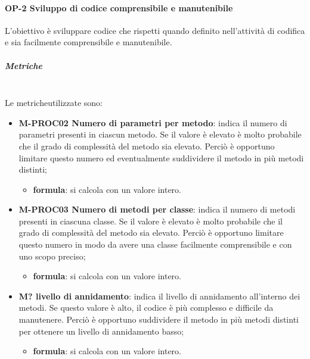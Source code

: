 		\paragraph{OP-2 Sviluppo di codice comprensibile e manutenibile}
		L'obiettivo è sviluppare codice che rispetti quando definito nell'attività di codifica e sia facilmente comprensibile e manutenibile.
		\subparagraph{Metriche}\mbox{}\\ [1mm]
		Le metriche\glosp utilizzate sono:
			\begin{itemize}
				\item \textbf{M-PROC02 Numero di parametri per metodo}: indica il numero di parametri presenti in ciascun metodo. Se il valore è elevato è molto probabile che il grado di complessità del metodo sia elevato. Perciò è opportuno limitare questo numero ed eventualmente suddividere il metodo in più metodi distinti;
				\begin{itemize}
					\item[] \textbf{formula}: si calcola con un valore intero.
				\end{itemize}
				\item \textbf{M-PROC03 Numero di metodi per classe}: indica il numero di metodi presenti in ciascuna classe. Se il valore è elevato è molto probabile che il grado di complessità del metodo sia elevato. Perciò è opportuno limitare questo numero in modo da avere una classe facilmente comprensibile e con uno scopo preciso;
				\begin{itemize}
					\item[] \textbf{formula}: si calcola con un valore intero.
				\end{itemize}
				\item \textbf{M? livello di annidamento}: indica il livello di annidamento all'interno dei metodi. Se questo valore è alto, il codice è più complesso e difficile da manutenere. Perciò è opportuno suddividere il metodo in più metodi distinti per ottenere un livello di annidamento basso;
				\begin{itemize}
					\item[] \textbf{formula}: si calcola con un valore intero.
				\end{itemize}
			\end{itemize}
	
